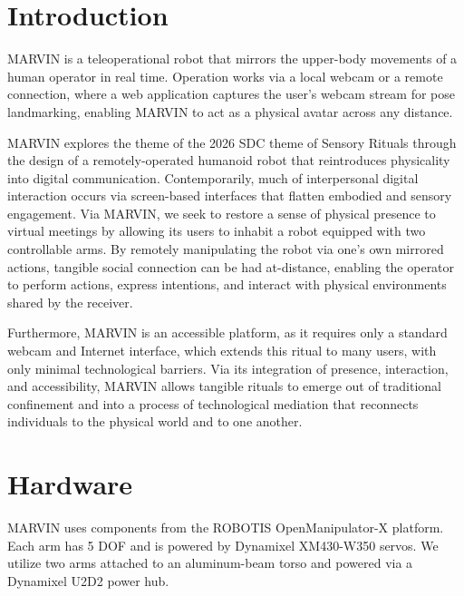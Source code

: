 \documentclass[acmsmall, screen]{acmart}
\begin{document}


\maketitle

\section{Introduction}
MARVIN is a teleoperational robot that mirrors the upper-body movements of a human operator in real time. Operation works via a local webcam or a remote connection, where a web application captures the user's webcam stream for pose landmarking, enabling MARVIN to act as a physical avatar across any distance.

MARVIN explores the theme of the 2026 SDC theme of Sensory Rituals through the design of a remotely-operated humanoid robot that reintroduces physicality into digital communication. Contemporarily, much of interpersonal digital interaction occurs via screen-based interfaces that flatten embodied and sensory engagement. Via MARVIN, we seek to restore a sense of physical presence to virtual meetings by allowing its users to inhabit a robot equipped with two controllable arms. By remotely manipulating the robot via one's own mirrored actions, tangible social connection can be had at-distance, enabling the operator to perform actions, express intentions, and interact with physical environments shared by the receiver.

Furthermore, MARVIN is an accessible platform, as it requires only a standard webcam and Internet interface, which extends this ritual to many users, with only minimal technological barriers. Via its integration of presence, interaction, and accessibility, MARVIN allows tangible rituals to emerge out of traditional confinement and into a process of technological mediation that reconnects individuals to the physical world and to one another.

\section{Hardware}
MARVIN uses components from the ROBOTIS OpenManipulator-X platform. Each arm has 5 DOF and is powered by Dynamixel XM430-W350 servos. We utilize two arms attached to an aluminum-beam torso and powered via a Dynamixel U2D2 power hub.
\end{document}
